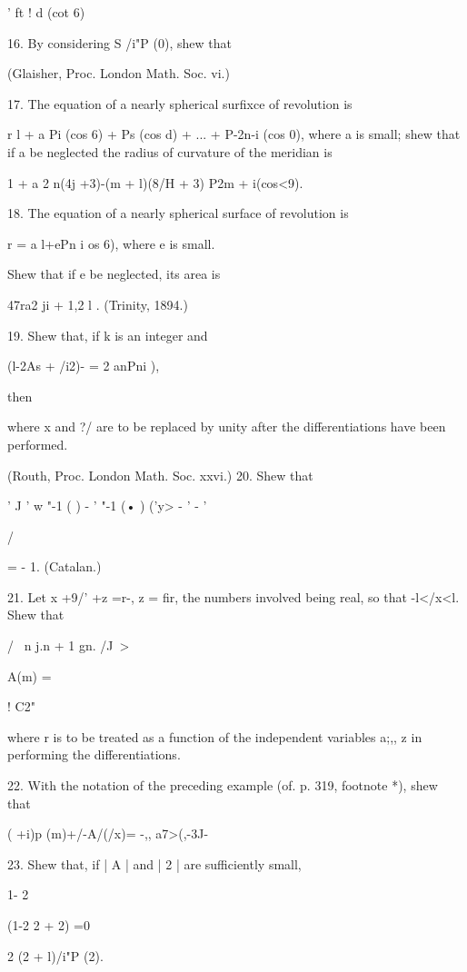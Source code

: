 {{{{' ft ! d (cot 6)

%
%

16. By considering S /i"P (0), shew that

(Glaisher, Proc. London Math. Soc. vi.)

17. The equation of a nearly spherical surfixce of revolution is

r l + a Pi (cos 6) + Ps (cos d) + ... + P-2n-i (cos 0), where a is
small; shew that if a be neglected the radius of curvature of the
meridian is

1 + a 2 n(4j +3)-(m + l)(8/H + 3) P2m + i(cos<9).


18. The equation of a nearly spherical surface of revolution is

r = a l+ePn i os 6), where e is small.

Shew that if e be neglected, its area is

47ra2 ji + 1,2 l . (Trinity, 1894.)

19. Shew that, if k is an integer and

(l-2As + /i2)- = 2 anPni ),

then

where x and ?/ are to be replaced by unity after the differentiations
have been performed.

(Routh, Proc. London Math. Soc. xxvi.) 20. Shew that

' J ' w "-1 ( ) - ' "-1 (• ) ('y> - ' - '

/

= - 1. (Catalan.)

21. Let x +9/' +z =r-, z = fir, the numbers involved being real, so
that -l</x<l. Shew that

/ \ n j.n + 1 gn. /J~>

A(m) =

  ! C2"

where r is to be treated as a function of the independent variables
a;,, z in performing the differentiations.

22. With the notation of the preceding example (of. p. 319, footnote
*), shew that

( +i)p (m)+/-A/(/x)= -,, a7>(,-3J-

23. Shew that, if | A | and | 2 | are sufficiently small,

1- 2

(1-2 2 + 2) =0

2 (2 + l)/i"P (2).

%
%

}}}}
